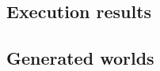\documentclass[12pt,titlepage]{article}
\begin{document}
\subsection{Execution results}\label{sec:mod1}
\begin{figure}[h]
\end{figure}
\clearpage

\begin{landscape}
\newpage
\subsection{Generated worlds}\label{sec:mod1}
\begin{figure}[h]
\end{figure}
\clearpage
\end{landscape}

\begin{landscape}
\newpage
\begin{figure}[h]
\end{figure}
\clearpage
\end{landscape}
\end{document}
